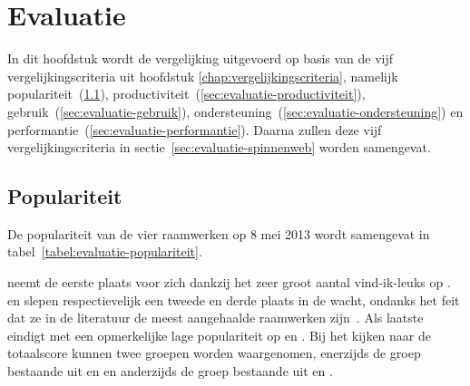\chapter{Evaluatie}
\label{chap:evaluatie}

In dit hoofdstuk wordt de vergelijking uitgevoerd op basis van de vijf vergelijkingscriteria uit hoofdstuk \ref{chap:vergelijkingscriteria}, namelijk populariteit~(\ref{sec:evaluatie-populariteit}), productiviteit~(\ref{sec:evaluatie-productiviteit}), gebruik~(\ref{sec:evaluatie-gebruik}), ondersteuning~(\ref{sec:evaluatie-ondersteuning}) en performantie~(\ref{sec:evaluatie-performantie}). 
Daarna zullen deze vijf vergelijkingscriteria in sectie~\ref{sec:evaluatie-spinnenweb} worden samengevat.


\section{Populariteit} %
\label{sec:evaluatie-populariteit}

De populariteit van de vier raamwerken op 8 mei 2013 wordt samengevat in tabel~\ref{tabel:evaluatie-populariteit}. 

\begin{table}[H]
\centering
{}
\caption{Overzicht van populariteit op 8 mei 2013 voor \st{}~(\sta), \kendo{}~(\kendoa), \jqm{}~(\jqma) en \lungo{}~(\lungoa).}
\label{tabel:evaluatie-populariteit}
\end{table}

\kendo{} neemt de eerste plaats voor zich dankzij het zeer groot aantal vind-ik-leuks op \fb.
\jqm{} en \st{} slepen respectievelijk een tweede en derde plaats in de wacht, ondanks het feit dat ze in de literatuur de meest aangehaalde raamwerken zijn~\cite{David2011,Firtman2013,Hales2012,Oeflman2011}. 
Als laatste eindigt \lungo{} met een opmerkelijke lage populariteit op \so{} en \fb.
Bij het kijken naar de totaalscore kunnen twee groepen worden waargenomen, enerzijds de groep bestaande uit \kendo{} en \jqm{} en anderzijds de groep bestaande uit \st{} en \lungo{}.

